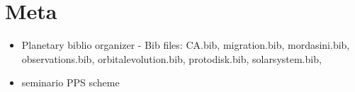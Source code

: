 \documentclass[main.tex]{subfiles}
\begin{document}
\chapter{Meta}
\begin{itemize}
    \item Planetary biblio organizer - Bib files: CA.bib, migration.bib, mordasini.bib, observations.bib, orbitalevolution.bib, protodisk.bib, solarsystem.bib,
    \item seminario PPS scheme
\end{itemize}
\end{document}
